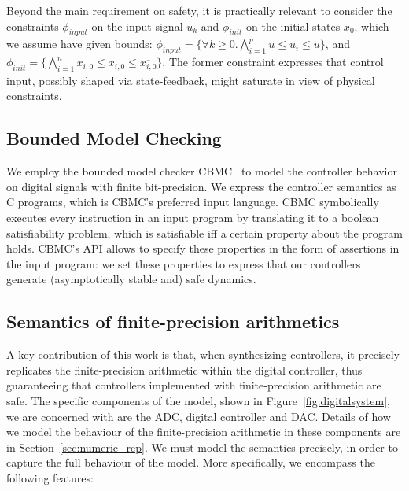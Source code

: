 \medskip 

Beyond the main requirement on safety, it is practically relevant to consider the 
constraints $\phi_\mathit{input}$ on the input
signal $u_{k}$ and $\phi_\mathit{init}$ on the initial states $x_0$,
which we assume have given bounds:
$\phi_\mathit{input} = \{\forall k \geq 0.\bigwedge_{i=1}^{p} \underline{u} \leq u_{i} \leq \overline{u}\} $,
and $\phi_\mathit{init} = \{ \bigwedge_{i=1}^{n} \underline{x_{i,0}} \leq x_{i,0} \leq \overline{x_{i,0}}\}$. 
The former constraint expresses that control input, possibly shaped via state-feedback, 
might saturate in view of physical constraints.


\subsection{Bounded Model Checking}
\label{sec:BMC}

We employ the bounded model checker CBMC~\cite{DBLP:conf/tacas/KroeningT14} to model the controller behavior on digital signals with finite bit-precision.  
We express the controller semantics as C programs, which is CBMC's preferred input language.  
CBMC symbolically executes every instruction in an input program by translating it to a boolean satisfiability problem,
 which is satisfiable iff a certain property about the program holds.  
CBMC's API allows to specify these properties in the form of assertions in the input program: 
we set these properties to express that our controllers generate (asymptotically stable and) safe dynamics. 

\subsection{Semantics of finite-precision arithmetics}
\label{sec:errors}

A key contribution of this work is that, when synthesizing controllers, it precisely replicates the finite-precision arithmetic within the digital controller, 
thus guaranteeing that controllers implemented with finite-precision arithmetic are safe. 
The specific components of the model, shown in Figure~\ref{fig:digitalsystem}, we are concerned with are the ADC, digital controller and DAC.
Details of how we model the behaviour of the finite-precision arithmetic in these components are in Section~\ref{sec:numeric_rep}. 
We must model the semantics precisely, in order to capture the full behaviour of the model. 
More specifically, we encompass the following features: 

